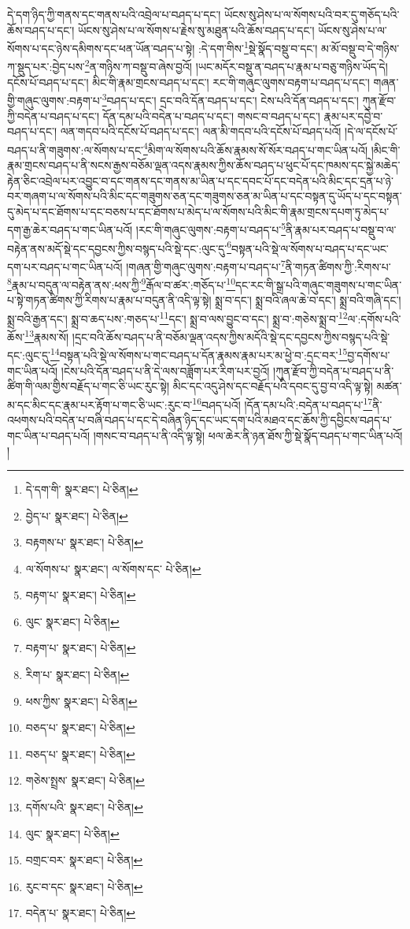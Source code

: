 དེ་དག་ཉིད་ཀྱི་གནས་དང་གནས་པའི་འབྲེལ་པ་བཤད་པ་དང་། ཡོངས་སུ་ཤེས་པ་ལ་སོགས་པའི་བར་དུ་གཅོད་པའི་ཆོས་བཤད་པ་དང་། ཡོངས་སུ་ཤེས་པ་ལ་སོགས་པ་རྗེས་སུ་མཐུན་པའི་ཆོས་བཤད་པ་དང་། ཡོངས་སུ་ཤེས་པ་ལ་སོགས་པ་དང་ཉེས་དམིགས་དང་ཕན་ཡོན་བཤད་པ་སྟེ། :དེ་དག་གིས་\footnote{དེ་དག་གི་  སྣར་ཐང་།  པེ་ཅིན། }སྡེ་སྣོད་བསྡུ་བ་དང་། མ་མོ་བསྡུ་བ་དེ་གཉིས་ཀ་སྡུད་པར་:བྱེད་པས་\footnote{བྱེད་པ་  སྣར་ཐང་།  པེ་ཅིན། }ན་གཉིས་ཀ་བསྡུ་བ་ཞེས་བྱའོ། །ཡང་མདོར་བསྡུ་ན་བཤད་པ་རྣམ་པ་བཅུ་གཉིས་ཡོད་དེ། དངོས་པོ་བཤད་པ་དང་། མིང་གི་རྣམ་གྲངས་བཤད་པ་དང་། རང་གི་གཞུང་ལུགས་བརྟག་པ་བཤད་པ་དང་། གཞན་གྱི་གཞུང་ལུགས་:བརྟག་པ་\footnote{བརྟགས་པ་  སྣར་ཐང་།  པེ་ཅིན། }བཤད་པ་དང་། དྲང་བའི་དོན་བཤད་པ་དང་། ངེས་པའི་དོན་བཤད་པ་དང་། ཀུན་རྫོབ་ཀྱི་བདེན་པ་བཤད་པ་དང་། དོན་དམ་པའི་བདེན་པ་བཤད་པ་དང་། གསང་བ་བཤད་པ་དང་། རྣམ་པར་དབྱེ་བ་བཤད་པ་དང་། ལན་གདབ་པའི་དངོས་པོ་བཤད་པ་དང་། ལན་མི་གདབ་པའི་དངོས་པོ་བཤད་པའོ། །དེ་ལ་དངོས་པོ་བཤད་པ་ནི་གཟུགས་:ལ་སོགས་པ་དང་\footnote{ལ་སོགས་པ་  སྣར་ཐང་། ལ་སོགས་དང་  པེ་ཅིན། }མིག་ལ་སོགས་པའི་ཆོས་རྣམས་སོ་སོར་བཤད་པ་གང་ཡིན་པའོ། །མིང་གི་རྣམ་གྲངས་བཤད་པ་ནི་སངས་རྒྱས་བཅོམ་ལྡན་འདས་རྣམས་ཀྱིས་ཆོས་བཤད་པ་ཕུང་པོ་དང་ཁམས་དང་སྐྱེ་མཆེད་རྟེན་ཅིང་འབྲེལ་པར་འབྱུང་བ་དང་གནས་དང་གནས་མ་ཡིན་པ་དང་དབང་པོ་དང་བདེན་པའི་མིང་དང་དྲན་པ་ཉེ་བར་གཞག་པ་ལ་སོགས་པའི་མིང་དང་གཟུགས་ཅན་དང་གཟུགས་ཅན་མ་ཡིན་པ་དང་བསྟན་དུ་ཡོད་པ་དང་བསྟན་དུ་མེད་པ་དང་ཐོགས་པ་དང་བཅས་པ་དང་ཐོགས་པ་མེད་པ་ལ་སོགས་པའི་མིང་གི་རྣམ་གྲངས་དཔག་ཏུ་མེད་པ་དག་རྒྱ་ཆེར་བཤད་པ་གང་ཡིན་པའོ། །རང་གི་གཞུང་ལུགས་:བརྟག་པ་བཤད་པ་\footnote{བརྟག་པ་  སྣར་ཐང་།  པེ་ཅིན། }ནི་རྣམ་པར་བཤད་པ་བསྡུ་བ་ལ་བརྟེན་ནས་མདོ་སྡེ་དང་དབྱངས་ཀྱིས་བསྙད་པའི་སྡེ་དང་:ལུང་དུ་\footnote{ལུང་  སྣར་ཐང་།  པེ་ཅིན། }བསྟན་པའི་སྡེ་ལ་སོགས་པ་བཤད་པ་དང་ཡང་དག་པར་བཤད་པ་གང་ཡིན་པའོ། །གཞན་གྱི་གཞུང་ལུགས་:བརྟག་པ་བཤད་པ་\footnote{བརྟག་པ་  སྣར་ཐང་།  པེ་ཅིན། }ནི་གཏན་ཚིགས་ཀྱི་:རིགས་པ་\footnote{རིག་པ་  སྣར་ཐང་།  པེ་ཅིན། }རྣམ་པ་བདུན་ལ་བརྟེན་ནས་:ཕས་ཀྱི་\footnote{ཕས་ཀྱིས་  སྣར་ཐང་།  པེ་ཅིན། }རྒོལ་བ་ཚར་:གཅོད་པ་\footnote{བཅད་པ་  སྣར་ཐང་།  པེ་ཅིན། }དང་རང་གི་སྒྲ་པའི་གཞུང་གཟུགས་པ་གང་ཡིན་པ་སྟེ་གཏན་ཚིགས་ཀྱི་རིགས་པ་རྣམ་པ་བདུན་ནི་འདི་ལྟ་སྟེ། སྨྲ་བ་དང་། སྨྲ་བའི་ཞལ་ཆེ་བ་དང་། སྨྲ་བའི་གཞི་དང་། སྨྲ་བའི་རྒྱན་དང་། སྨྲ་བ་ཆད་པས་:གཅད་པ་\footnote{བཅད་པ་  སྣར་ཐང་།  པེ་ཅིན། }དང་། སྨྲ་བ་ལས་བྱུང་བ་དང་། སྨྲ་བ་:གཅེས་སྨྲ་བ་\footnote{གཅེས་སྤྲས་  སྣར་ཐང་།  པེ་ཅིན། }ལ་:དགོས་པའི་ཆོས་\footnote{དགོས་པའི་  སྣར་ཐང་།  པེ་ཅིན། }རྣམས་སོ། །དྲང་བའི་ཆོས་བཤད་པ་ནི་བཅོམ་ལྡན་འདས་ཀྱིས་མདོའི་སྡེ་དང་དབྱངས་ཀྱིས་བསྙད་པའི་སྡེ་དང་:ལུང་དུ་\footnote{ལུང་  སྣར་ཐང་།  པེ་ཅིན། }བསྟན་པའི་སྡེ་ལ་སོགས་པ་གང་བཤད་པ་དོན་རྣམས་རྣམ་པར་མ་ཕྱེ་བ་:དྲང་བར་\footnote{བགྲང་བར་  སྣར་ཐང་།  པེ་ཅིན། }བྱ་དགོས་པ་གང་ཡིན་པའོ། །ངེས་པའི་དོན་བཤད་པ་ནི་དེ་ལས་བཟློག་པར་རིག་པར་བྱའོ། །ཀུན་རྫོབ་ཀྱི་བདེན་པ་བཤད་པ་ནི་ཚིག་གི་ལམ་གྱིས་བརྗོད་པ་གང་ཅི་ཡང་རུང་སྟེ། མིང་དང་འདུ་ཤེས་དང་བརྗོད་པའི་དབང་དུ་བྱ་བ་འདི་ལྟ་སྟེ། མཚན་མ་དང་མིང་དང་རྣམ་པར་རྟོག་པ་གང་ཅི་ཡང་:རུང་བ་\footnote{རུང་བ་དང་  སྣར་ཐང་།  པེ་ཅིན། }བཤད་པའོ། །དོན་དམ་པའི་:བདེན་པ་བཤད་པ་\footnote{བདེན་པ་  སྣར་ཐང་།  པེ་ཅིན། }ནི་འཕགས་པའི་བདེན་པ་བཞི་བཤད་པ་དང་དེ་བཞིན་ཉིད་དང་ཡང་དག་པའི་མཐའ་དང་ཆོས་ཀྱི་དབྱིངས་བཤད་པ་གང་ཡིན་པ་བཤད་པའོ། །གསང་བ་བཤད་པ་ནི་འདི་ལྟ་སྟེ། ཕལ་ཆེར་ནི་ཉན་ཐོས་ཀྱི་སྡེ་སྣོད་བཤད་པ་གང་ཡིན་པའོ། །
